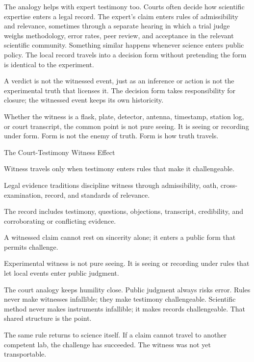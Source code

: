 The analogy helps with expert testimony too. Courts often decide how
scientific expertise enters a legal record. The expert's claim enters
rules of admissibility and relevance, sometimes through a separate
hearing in which a trial judge weighs methodology, error rates, peer
review, and acceptance in the relevant scientific community. Something
similar happens whenever science enters public policy. The local record
travels into a decision form without pretending the form is identical
to the experiment.

A verdict is not the witnessed event, just as an inference or action is
not the experimental truth that licenses it. The decision form takes
responsibility for closure; the witnessed event keeps its own
historicity.

Whether the witness is a flask, plate, detector, antenna, timestamp,
station log, or court transcript, the common point is not pure seeing.
It is seeing or recording under form. Form is not the enemy of truth.
Form is how truth travels.

\begin{phenom}{The Court-Testimony Witness Effect~\cite{wigmore1904}}
\label{ph:court-testimony-witness}

\PhStatement
Witness travels only when testimony enters rules that make it challengeable.

\PhOrigin
Legal evidence traditions discipline witness through admissibility, oath,
cross-examination, record, and standards of relevance.

\PhObservation
The record includes testimony, questions, objections, transcript, credibility,
and corroborating or conflicting evidence.

\PhConstraint
A witnessed claim cannot rest on sincerity alone; it enters a public form
that permits challenge.

\PhConsequence
Experimental witness is not pure seeing. It is seeing or recording under rules
that let local events enter public judgment.
\end{phenom}

The court analogy keeps humility close. Public judgment always risks
error. Rules never make witnesses infallible; they make testimony
challengeable. Scientific method never makes instruments infallible; it
makes records challengeable. That shared structure is the point.

The same rule returns to science itself. If a claim cannot travel to
another competent lab, the challenge has succeeded. The witness was not
yet transportable.


